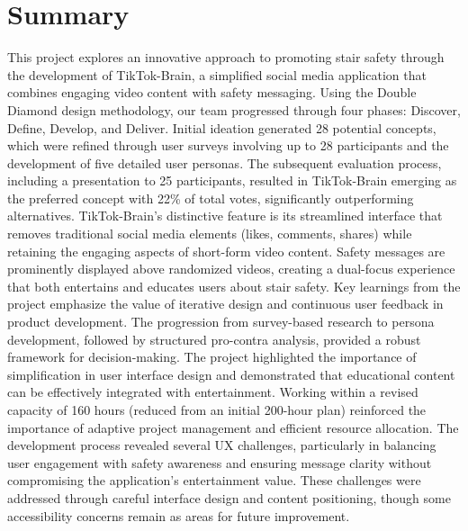 \documentclass{article}
\begin{document}
\section{Summary}
This project explores an innovative approach to promoting stair safety through the development of TikTok-Brain,
a simplified social media application that combines engaging video content with safety messaging.
Using the Double Diamond design methodology, our team progressed through four phases: Discover, Define, Develop, and Deliver.
Initial ideation generated 28 potential concepts,
which were refined through user surveys involving up to 28 participants and the development of five detailed user personas.
The subsequent evaluation process, including a presentation to 25 participants,
resulted in TikTok-Brain emerging as the preferred concept with 22\% of total votes, significantly outperforming alternatives.
TikTok-Brain's distinctive feature is its streamlined interface that removes traditional social media elements
(likes, comments, shares) while retaining the engaging aspects of short-form video content.
Safety messages are prominently displayed above randomized videos,
creating a dual-focus experience that both entertains and educates users about stair safety.
Key learnings from the project emphasize the value of iterative design and continuous user feedback in product development.
The progression from survey-based research to persona development,
followed by structured pro-contra analysis, provided a robust framework for decision-making.
The project highlighted the importance of simplification in user interface design
and demonstrated that educational content can be effectively integrated with entertainment.
Working within a revised capacity of 160 hours (reduced from an initial 200-hour plan)
reinforced the importance of adaptive project management and efficient resource allocation.
The development process revealed several UX challenges,
particularly in balancing user engagement with safety awareness and ensuring message clarity
without compromising the application's entertainment value.
These challenges were addressed through careful interface design and content positioning,
though some accessibility concerns remain as areas for future improvement.

\end{document}
